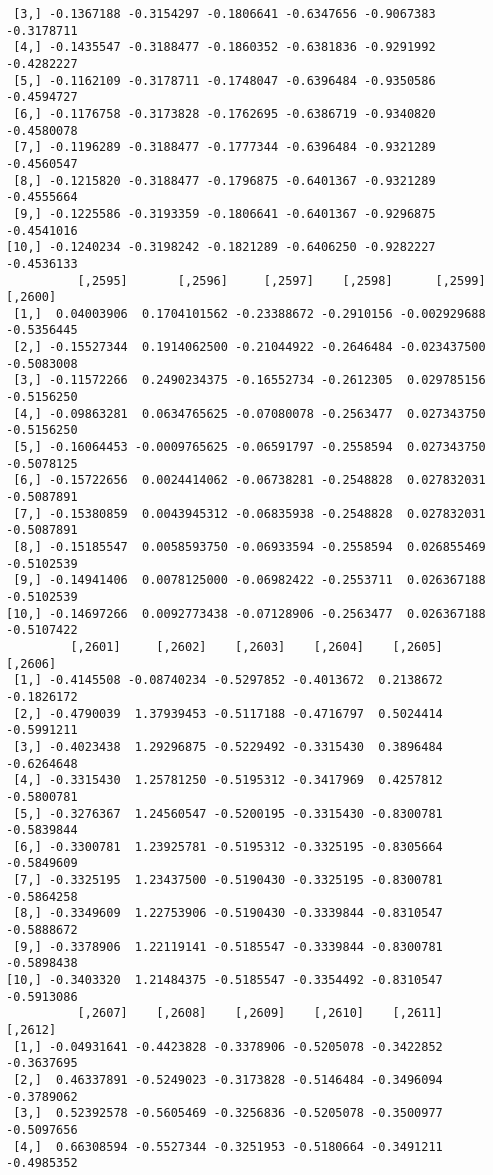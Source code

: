 \documentclass[
  letterpaper,
  DIV=11,
  numbers=noendperiod]{scrreprt}
\begin{document}
\begin{verbatim}
 [3,] -0.1367188 -0.3154297 -0.1806641 -0.6347656 -0.9067383 -0.3178711
 [4,] -0.1435547 -0.3188477 -0.1860352 -0.6381836 -0.9291992 -0.4282227
 [5,] -0.1162109 -0.3178711 -0.1748047 -0.6396484 -0.9350586 -0.4594727
 [6,] -0.1176758 -0.3173828 -0.1762695 -0.6386719 -0.9340820 -0.4580078
 [7,] -0.1196289 -0.3188477 -0.1777344 -0.6396484 -0.9321289 -0.4560547
 [8,] -0.1215820 -0.3188477 -0.1796875 -0.6401367 -0.9321289 -0.4555664
 [9,] -0.1225586 -0.3193359 -0.1806641 -0.6401367 -0.9296875 -0.4541016
[10,] -0.1240234 -0.3198242 -0.1821289 -0.6406250 -0.9282227 -0.4536133
          [,2595]       [,2596]     [,2597]    [,2598]      [,2599]    [,2600]
 [1,]  0.04003906  0.1704101562 -0.23388672 -0.2910156 -0.002929688 -0.5356445
 [2,] -0.15527344  0.1914062500 -0.21044922 -0.2646484 -0.023437500 -0.5083008
 [3,] -0.11572266  0.2490234375 -0.16552734 -0.2612305  0.029785156 -0.5156250
 [4,] -0.09863281  0.0634765625 -0.07080078 -0.2563477  0.027343750 -0.5156250
 [5,] -0.16064453 -0.0009765625 -0.06591797 -0.2558594  0.027343750 -0.5078125
 [6,] -0.15722656  0.0024414062 -0.06738281 -0.2548828  0.027832031 -0.5087891
 [7,] -0.15380859  0.0043945312 -0.06835938 -0.2548828  0.027832031 -0.5087891
 [8,] -0.15185547  0.0058593750 -0.06933594 -0.2558594  0.026855469 -0.5102539
 [9,] -0.14941406  0.0078125000 -0.06982422 -0.2553711  0.026367188 -0.5102539
[10,] -0.14697266  0.0092773438 -0.07128906 -0.2563477  0.026367188 -0.5107422
         [,2601]     [,2602]    [,2603]    [,2604]    [,2605]    [,2606]
 [1,] -0.4145508 -0.08740234 -0.5297852 -0.4013672  0.2138672 -0.1826172
 [2,] -0.4790039  1.37939453 -0.5117188 -0.4716797  0.5024414 -0.5991211
 [3,] -0.4023438  1.29296875 -0.5229492 -0.3315430  0.3896484 -0.6264648
 [4,] -0.3315430  1.25781250 -0.5195312 -0.3417969  0.4257812 -0.5800781
 [5,] -0.3276367  1.24560547 -0.5200195 -0.3315430 -0.8300781 -0.5839844
 [6,] -0.3300781  1.23925781 -0.5195312 -0.3325195 -0.8305664 -0.5849609
 [7,] -0.3325195  1.23437500 -0.5190430 -0.3325195 -0.8300781 -0.5864258
 [8,] -0.3349609  1.22753906 -0.5190430 -0.3339844 -0.8310547 -0.5888672
 [9,] -0.3378906  1.22119141 -0.5185547 -0.3339844 -0.8300781 -0.5898438
[10,] -0.3403320  1.21484375 -0.5185547 -0.3354492 -0.8310547 -0.5913086
          [,2607]    [,2608]    [,2609]    [,2610]    [,2611]    [,2612]
 [1,] -0.04931641 -0.4423828 -0.3378906 -0.5205078 -0.3422852 -0.3637695
 [2,]  0.46337891 -0.5249023 -0.3173828 -0.5146484 -0.3496094 -0.3789062
 [3,]  0.52392578 -0.5605469 -0.3256836 -0.5205078 -0.3500977 -0.5097656
 [4,]  0.66308594 -0.5527344 -0.3251953 -0.5180664 -0.3491211 -0.4985352

\end{verbatim}
\end{document}
